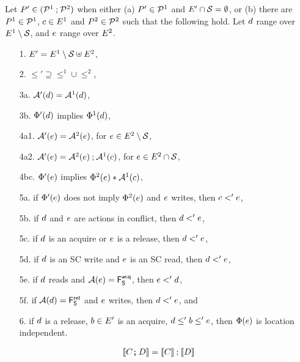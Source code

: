 \begin{definition}
  \label{def:semi:seq}
  Let $P'\in (\mathcal{P}^1 \mathbin; \mathcal{P}^2)$ %
  when either (a) $P' \in \mathcal{P}^1$ and
  $E'\cap\mathcal{S}=\emptyset$, or (b) there are $P^1 \in \mathcal{P}^1$,
  $c\in E^1$ and $P^2\in\mathcal{P}^2$ such that the following hold.  Let
  $d$ range over $E^1\setminus\mathcal{S}$, and $e$ range over
  $E^2$.
\begin{enumerate}
\item[1.] $E' = E^1\setminus\mathcal{S} \uplus E^2$,
\item[2.] ${\le'}\supseteq{\le^1}\cup{\le^2}$, 
\item[3a.] $\mathcal{A}'(d) = \mathcal{A}^1(d)$,
\item[3b.] $\Phi'(d)$ implies $\Phi^1(d)$,
\item[4a1.] $\mathcal{A}'(e) = \mathcal{A}^2(e)$,  for $e\in E^2\setminus\mathcal{S}$,
\item[4a2.] $\mathcal{A}'(e) =  \mathcal{A}^2(e)\mathbin{;}\mathcal{A}^1(c)$,  for $e\in E^2\cap\mathcal{S}$, 
\item[4bc.] $\Phi'(e)$ implies $\Phi^2(e)\mathbin{\ast}\mathcal{A}^1(c)$,
\item[5a.] if $\Phi'(e)$ does not imply $\Phi^2(e)$ and
  $e$ writes, then $c<'e$,
\item[5b.] if $d$ and $e$ are \external actions in conflict, then
  $d<'e$,
\item[5c.] if $d$ is an acquire or $e$ is a release, then
  $d <' e$,
\item[5d.] if $d$ is an SC write and $e$ is an SC read, then
  $d <' e$, 
\item[5e.] if $d$ reads and $\mathcal{A}(e)=\smash{\mathsf{F}_{\mathsf{S}}^{{\mathsf{acq}}}}$, then
  $e <' d$,
\item[5f.] if $\mathcal{A}(d)=\smash{\mathsf{F}_{\mathsf{S}}^{{\mathsf{rel}}}}$ and $e$ writes, then
  $d <' e$, and
\item[6.] if $d$ is a release, $b\in E'$ is an acquire,
  $d\le'b\le'e$, then $\Phi(e)$ is location independent.
\end{enumerate}
\begin{gather*}
  \llbracket C \texttt{;}\,\allowbreak D\rrbracket
  =  \llbracket C\rrbracket \mathbin; \llbracket D\rrbracket
\end{gather*}
\end{definition}


